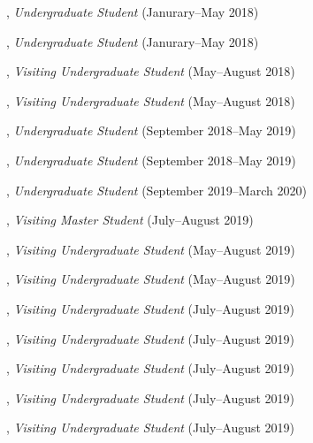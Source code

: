 \documentclass[10pt]{article}
\newenvironment{myindentpar}[1]%
{\begin{list}{}%
         {\setlength{\leftmargin}{#1}}%
         \item[]%
}
{\end{list}}
\newcounter{list}
\begin{document}
\begin{myindentpar}{0.75cm}
	
\hspace{-0.75cm}{\bf Matthew Malir}, \emph{Undergraduate Student} (Janurary--May 2018)
	
\hspace{-0.75cm}{\bf Sebastian Miner}, \emph{Undergraduate Student} (Janurary--May 2018)

\hspace{-0.75cm}{\bf Wenhao Yu}, \emph{Visiting Undergraduate Student} (May--August 2018)

\hspace{-0.75cm}{\bf Yu Shu}, \emph{Visiting Undergraduate Student} (May--August 2018)

\hspace{-0.75cm}{\bf Matthew Schoenbauer}, \emph{Undergraduate Student} (September 2018--May 2019)
	
\hspace{-0.75cm}{\bf Tina Wu}, \emph{Undergraduate Student} (September 2018--May 2019)

\hspace{-0.75cm}{\bf Chan Hee Song}, \emph{Undergraduate Student} (September 2019--March 2020)

\hspace{-0.75cm}{\bf Zijian Hu}, \emph{Visiting Master Student} (July--August 2019)

\hspace{-0.75cm}{\bf Yihong Ma}, \emph{Visiting Undergraduate Student} (May--August 2019)

\hspace{-0.75cm}{\bf Chuchen Deng}, \emph{Visiting Undergraduate Student} (May--August 2019)

\hspace{-0.75cm}{\bf Zhihan Zhang}, \emph{Visiting Undergraduate Student} (July--August 2019)

\hspace{-0.75cm}{\bf Xin Liu}, \emph{Visiting Undergraduate Student} (July--August 2019)

\hspace{-0.75cm}{\bf Mengxia Yu}, \emph{Visiting Undergraduate Student} (July--August 2019)

\hspace{-0.75cm}{\bf Wei Peng}, \emph{Visiting Undergraduate Student} (July--August 2019)

\hspace{-0.75cm}{\bf Kaifeng Yu}, \emph{Visiting Undergraduate Student} (July--August 2019)


\end{myindentpar}
\end{document}
